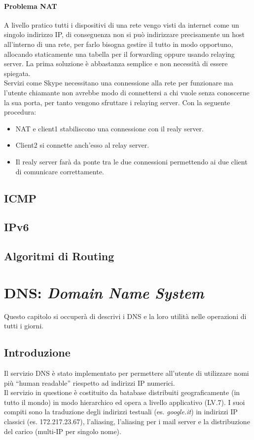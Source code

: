 \documentclass[12pt]{article}
\begin{document}
\paragraph{Problema NAT} A livello pratico tutti i dispositivi di una rete vengo visti da internet come un singolo indirizzo IP, di conseguenza non si può indirizzare precisamente un host all'interno di una rete, per farlo bisogna gestire il tutto in modo opportuno, allocando staticamente una tabella per il forwarding oppure usando relaying server.
La prima soluzione è abbastanza semplice e non necessità di essere spiegata.\\
Servizi come Skype necessitano una connessione alla rete per funzionare ma l'utente chiamante non avrebbe modo di connettersi a chi vuole senza conoscerne la sua porta, per tanto vengono sfruttare i relaying server. Con la seguente procedura:
\begin{itemize}
  \item NAT e client1 stabiliscono una connessione con il realy server.
  \item Client2 si connette anch'esso al relay server.
  \item Il realy server farà da ponte tra le due connessioni permettendo ai due client di comunicare correttamente.
\end{itemize}



\subsection{ICMP}

\subsection{IPv6}

\subsection{Algoritmi di Routing}


\section{DNS: \textit{Domain Name System}} \label{sec:dns} %
Questo capitolo si occuperà di descrivi i DNS e la loro utilità nelle operazioni di tutti i giorni.

\subsection{Introduzione} %
Il servizio DNS è stato implementato per permettere all'utente di utilizzare nomi più ``human readable'' riespetto ad indirizzi IP numerici.\\
Il servizio in questione è costituito da batabase distribuiti geograficamente (in tutto il mondo) in modo hierarchico ed opera a livello applicativo (LV.7). I suoi compiti sono la traduzione degli indirizzi testuali (es. \textit{google.it}) in indirizzi IP classici (es. 172.217.23.67), l'aliasing, l'aliasing per i mail server e la distribuzione del carico (multi-IP per singolo nome).
\end{document}
